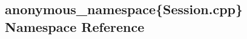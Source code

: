 \hypertarget{namespaceanonymous__namespace_02Session_8cpp_03}{\subsection{anonymous\-\_\-namespace\{Session.\-cpp\} Namespace Reference}
\label{namespaceanonymous__namespace_02Session_8cpp_03}
}
